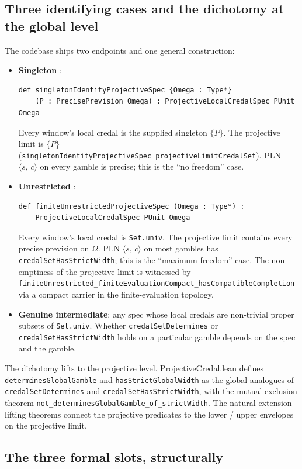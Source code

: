 \documentclass[]{article}
\newcommand{\lid}[1]{{\ttfamily\nolinkurl{#1}}}
\newcommand{\STV}[2]{\langle #1,\, #2 \rangle}
\begin{document}
\subsection{Three identifying cases and the dichotomy at the global level}

The codebase ships two endpoints and one general construction:
\begin{itemize}
\item \textbf{Singleton} :
\begin{lstlisting}
def singletonIdentityProjectiveSpec {Omega : Type*}
    (P : PrecisePrevision Omega) : ProjectiveLocalCredalSpec PUnit Omega
\end{lstlisting}
Every window's local credal is the supplied singleton $\{P\}$. The
projective limit is $\{P\}$
(\lid{singletonIdentityProjectiveSpec\_projectiveLimitCredalSet}). PLN $\STV{s}{c}$ on every gamble is precise; this is the
``no freedom'' case.

\item \textbf{Unrestricted} :
\begin{lstlisting}
def finiteUnrestrictedProjectiveSpec (Omega : Type*) :
    ProjectiveLocalCredalSpec PUnit Omega
\end{lstlisting}
Every window's local credal is \lid{Set.univ}. The projective limit
contains every precise prevision on $\Omega$. PLN $\STV{s}{c}$ on most
gambles has \lid{credalSetHasStrictWidth}; this is the ``maximum freedom''
case. The non-emptiness of the projective limit is witnessed by
\lid{finiteUnrestricted\_finiteEvaluationCompact\_hasCompatibleCompletion}
via a compact carrier in the finite-evaluation topology.

\item \textbf{Genuine intermediate}: any spec whose local credals are
non-trivial proper subsets of \lid{Set.univ}. Whether
\lid{credalSetDetermines} or \lid{credalSetHasStrictWidth} holds on a
particular gamble depends on the spec and the gamble.
\end{itemize}

The dichotomy lifts to the projective level. ProjectiveCredal.lean defines
\lid{determinesGlobalGamble} and \lid{hasStrictGlobalWidth}
as the global analogues of \lid{credalSetDetermines} and
\lid{credalSetHasStrictWidth}, with the mutual exclusion theorem
\lid{not\_determinesGlobalGamble\_of\_strictWidth}. The
natural-extension lifting theorems connect
the projective predicates to the lower / upper envelopes on the projective
limit.

\subsection{The three formal slots, structurally}\label{sec:slots-structural}
\end{document}

